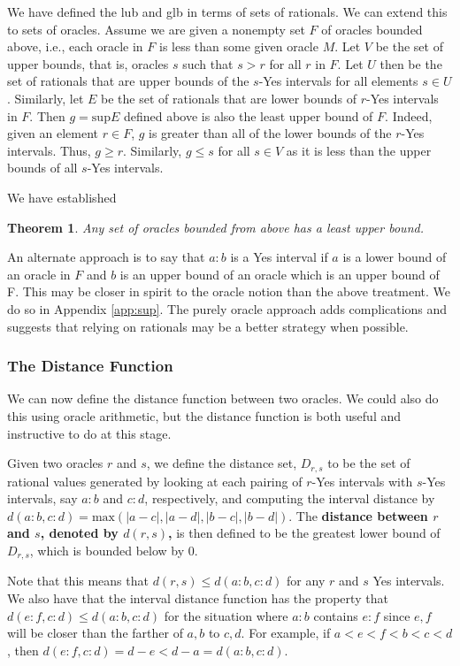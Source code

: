 \documentclass[12pt]{article}
\newtheorem{theorem}{Theorem}[subsection]
\theoremstyle{remark}
\begin{document}
We have defined the lub and glb in terms of sets of rationals. We can extend this to sets of oracles. Assume we are given a nonempty set $F$ of oracles bounded above, i.e., each oracle in $F$ is less than some given oracle $M$. Let $V$ be the set of upper bounds, that is, oracles $s$ such that $s > r$ for all $r$ in $F$. Let $U$ then be the set of rationals that are upper bounds of the $s$-Yes intervals for all elements $s \in U$. Similarly, let $E$ be the set of rationals that are lower bounds of $r$-Yes intervals in $F$. Then $g = \mathrm{sup} E$ defined above is also the least upper bound of $F$.  Indeed, given an element $r \in F$, $g$ is greater than all of the lower bounds of the $r$-Yes intervals. Thus, $g \geq r$. Similarly, $g \leq s$ for all $s \in V$ as it is less than the upper bounds of all $s$-Yes intervals. 

We have established

\begin{theorem}\label{th:lub}
Any set of oracles bounded from above has a least upper bound. 
\end{theorem}

An alternate approach is to say that $a:b$ is a Yes interval if $a$ is a lower bound of an oracle in $F$ and $b$ is an upper bound of an oracle which is an upper bound of F. This may be closer in spirit to the oracle notion than the above treatment. We do so in Appendix \ref{app:sup}. The purely oracle approach adds complications and suggests that relying on rationals may be a better strategy when possible. 

\subsubsection{The Distance Function}

We can now define the distance function between two oracles. We could also do this using oracle arithmetic, but the distance function is both useful and instructive to do at this stage. 

Given two oracles $r$ and $s$, we define the distance set, $D_{r,s}$ to be the set of rational values generated by looking at each pairing of $r$-Yes intervals with $s$-Yes intervals, say  $a:b$ and $c:d$, respectively, and computing the interval distance by $d(a:b,c:d) = \mathrm{max}(|a-c|, |a-d|,|b-c|,|b-d|)$. The \textbf{distance between $r$ and $s$, denoted by $d(r,s)$,} is then defined to be the greatest lower bound of $D_{r,s}$, which is bounded below by 0. 

Note that this means that $d(r,s) \leq d(a:b, c:d)$ for any $r$ and $s$ Yes intervals. We also have that the interval distance function has the property that $d(e:f, c:d) \leq d(a:b, c:d)$ for the situation where $a:b$ contains $e:f$ since $e, f$ will be closer than the farther of $a,b$ to $c,d$. For example, if $a < e < f < b < c< d$, then $d(e:f, c:d) = d-e < d-a = d(a:b, c:d)$. 
\end{document}
